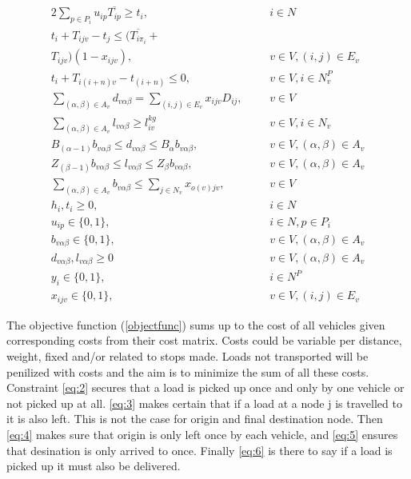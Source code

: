 \documentclass[../main.tex]{subfiles}
\begin{document}
\begin{alignat} {2}
    \sum_{p\in P_i} u_{ip}\overline{T_{ip}} \geq t_{i},			& 	&& 	i \in N 					\label{eq:18}	\\[4pt]
    t_{i} + T_{ijv} - t_{j} \leq (\overline{T_{i\pi_i}} + 		& 	&&						\nonumber\\
    T_{ijv})(1 - x_{ijv}),						& 	&& 	v \in V, (i,j) \in E_v				\label{eq:19}	\\[8pt]
    t_{i} + T_{i(i+n)v} - t_{(i+n)} \leq 0,				& 	&& 	v \in V, i \in N_v^P				\label{eq:20}	\\[8pt]
    \sum_{(\alpha,\beta)\in A_v}d_{v\alpha\beta} = 
    \sum_{(i,j) \in E_v} x_{ijv}D_{ij},					& 	&&	v \in V						\label{eq:21}	\\[4pt]
    \sum_{(\alpha,\beta) \in A_v} l_{v\alpha\beta} \geq l_{iv}^{kg}	&	&& 	v \in V, i \in N_v				\label{eq:22}	\\[4pt]
    B_{(\alpha-1)}b_{v\alpha\beta} \leq d_{v\alpha\beta} \leq 
    B_\alpha b_{v\alpha\beta},				        	& 	&&	v \in V, (\alpha, \beta) \in A_v		\label{eq:23}	\\[8pt]
    Z_{(\beta-1)}b_{v\alpha\beta} \leq l_{v\alpha\beta} \leq 
    Z_\beta b_{v\alpha\beta},				        	& 	&&	v \in V, (\alpha, \beta) \in A_v		\label{eq:24}	\\[8pt]   	
    \sum_{(\alpha, \beta) \in A_v} b_{v\alpha\beta} \leq		
    \sum_{j\in N_v}x_{o(v)jv},                                          & 	&&	v \in V						\label{eq:25}	\\[4pt]
    h_i, t_i \geq 0,							& 	&&	i \in N 					\label{eq:26}	\\[8pt]
    u_{ip} \in \{0, 1\},						& 	&&	i \in N, p \in P_i 				\label{eq:27}	\\[8pt]
    b_{v\alpha\beta} \in \{0, 1\},					& 	&&	v \in V, (\alpha,\beta) \in A_v 		\label{eq:28}	\\[8pt]
    d_{v\alpha\beta}, l_{v\alpha\beta} \geq 0                           &       &&      v \in V, (\alpha,\beta) \in A_v 		\label{eq:29}	\\[8pt]
    y_i \in \{0, 1\},                                                   &       &&      i \in N^P                                       \label{eq:30}   \\[8pt]
    x_{ijv} \in \{0, 1\},						&	&&	v \in V, (i, j) \in E_v 			\label{eq:31}
\end{alignat} 
\endgroup

\par
The objective function (\ref{objectfunc}) sums up to the cost of all vehicles given corresponding costs from their cost matrix. Costs could be variable per distance, weight, fixed and/or related to stops made. Loads not transported will be penilized with costs and the aim is to minimize the sum of all these costs.
Constraint \ref{eq:2} secures that a load is picked up once and only by one vehicle or not picked up at all. 
\ref{eq:3} makes certain that if a load at a node j is travelled to it is also left. This is not the case for origin and final destination node.
Then \ref{eq:4} makes sure that origin is only left once by each vehicle, 
and \ref{eq:5} ensures that desination is only arrived to once.
Finally \ref{eq:6} is there to say if a load is picked up it must also be delivered. \par
\end{document}
